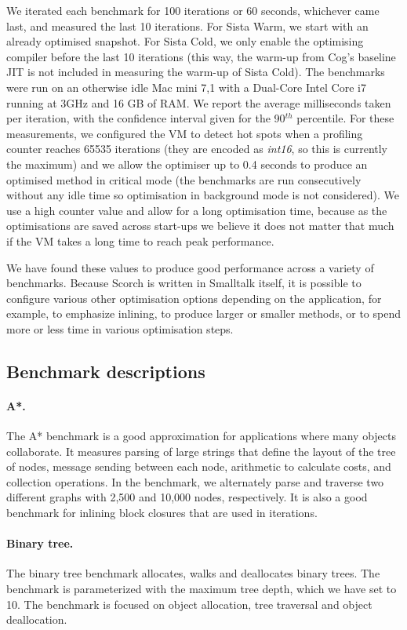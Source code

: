\documentclass[a4paper,12pt,twoside]{../includes/ThesisStyle}
\begin{document}
We iterated each benchmark for 100 iterations or 60 seconds, whichever came last, and measured the last 10 iterations. For Sista Warm, we start with an already optimised snapshot. For Sista Cold, we only enable the optimising compiler before the last 10 iterations (this way, the warm-up from Cog's baseline JIT is not included in measuring the warm-up of Sista Cold). The benchmarks were run on an otherwise idle Mac mini 7,1 with a Dual-Core Intel Core i7 running at 3GHz and 16 GB of RAM. We report the average milliseconds taken per iteration, with the confidence interval given for the 90$^{th}$ percentile. For these measurements, we configured the VM to detect hot spots when a profiling counter reaches 65535 iterations (they are encoded as \emph{int16}, so this is currently the maximum) and we allow the optimiser up to 0.4 seconds to produce an optimised method in critical mode (the benchmarks are run consecutively without any idle time so optimisation in background mode is not considered). We use a high counter value and allow for a long optimisation time, because as the optimisations are saved across start-ups we believe it does not matter that much if the VM takes a long time to reach peak performance. 

We have found these values to produce good performance across a variety of benchmarks. Because Scorch is written in Smalltalk itself, it is possible to configure various other optimisation options depending on the application, for example, to emphasize inlining, to produce larger or smaller methods, or to spend more or less time in various optimisation steps. 

\subsection{Benchmark descriptions}

	\paragraph{A*.}The A* benchmark is a good approximation for applications where many objects collaborate. It measures parsing of large strings that define the layout of the tree of nodes, message sending between each node, arithmetic to calculate costs, and collection operations. In the benchmark, we alternately parse and traverse two different graphs with 2,500 and 10,000 nodes, respectively. It is also a good benchmark for inlining block closures that are used in iterations.

	\paragraph{Binary tree.}The binary tree benchmark allocates, walks and deallocates binary trees. The benchmark is parameterized with the maximum tree depth, which we have set to 10. The benchmark is focused on object allocation, tree traversal and object deallocation.
\end{document}
